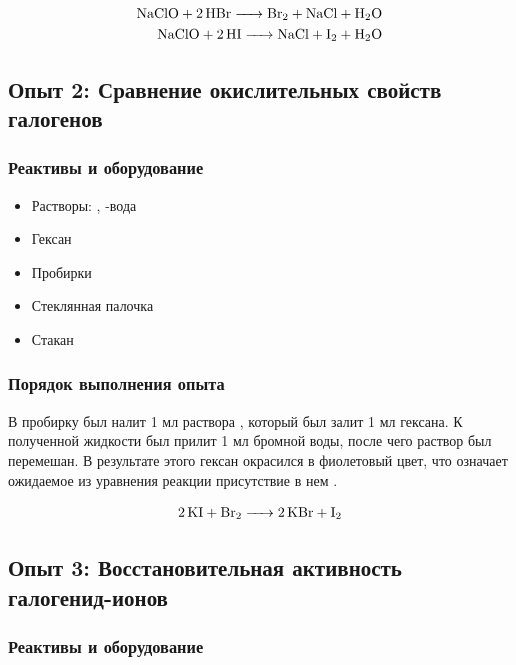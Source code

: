 \documentclass[a4paper, 12pt]{article}
\begin{document}
\begin{align}
	\ce{NaClO + 2HBr -> Br2 + NaCl + H2O}\\
	\ce{NaClO + 2HI -> NaCl + I2 + H2O}
\end{align}


\subsection{Опыт 2: Сравнение окислительных свойств галогенов}

\subsubsection{Реактивы и оборудование}

\begin{itemize}
	\item Растворы: , -вода
	
	\item Гексан
	
	\item Пробирки
	
	\item Стеклянная палочка
	
	\item Стакан
\end{itemize}

\subsubsection{Порядок выполнения опыта}

В пробирку был налит 1 мл раствора , который был залит 1 мл гексана. К полученной жидкости был прилит 1 мл бромной воды, после чего раствор был перемешан. В результате этого гексан окрасился в фиолетовый цвет, что означает ожидаемое из уравнения реакции присутствие в нем .

\begin{align}
	\ce{2KI + Br2 -> 2KBr + I2}
\end{align}


\subsection{Опыт 3: Восстановительная активность галогенид-ионов}

\subsubsection{Реактивы и оборудование}
\end{document}
